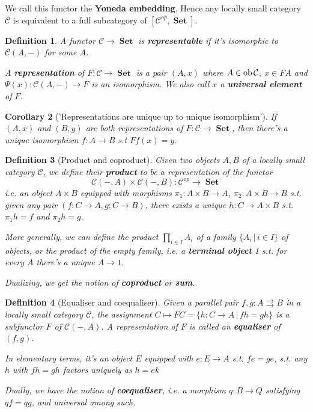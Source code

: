 \documentclass[a4paper]{article}
\newtheorem{definition}{Definition}
\newtheorem{corollary}[definition]{Corollary}
\numberwithin{definition}{section}
\newcommand*\ob[1]{\textnormal{ob}\,#1}
\DeclareMathOperator{\Set}{\textbf{Set}}
\begin{document}
We call this functor the \textbf{Yoneda embedding}. Hence any locally small category $\mathcal{C}$ is equivalent to a full subcategory of $[\mathcal{C}^{op}, \Set]$.

\begin{definition}
	A functor $\mathcal{C} \to \Set$ is \textbf{representable} if it's isomorphic to $\mathcal{C}(A, -)$ for some $A$.
	
	A \textbf{representation} of $F: \mathcal{C} \to \Set$ is a pair $(A, x)$ where $A \in \ob \mathcal{C}$, $x \in FA$ and $\Psi(x): \mathcal{C}(A, -) \to F$ is an isomorphism.
	We also call $x$ a \textbf{universal element} of $F$.
\end{definition}

\begin{corollary}['Representations are unique up to unique isomorphism']
	If $(A, x)$ and $(B, y)$ are both representations of $F: \mathcal{C} \to \Set$, then there's a unique isomorphism $f: A \to B$ s.t $Ff(x)=y$.
\end{corollary}

\begin{definition}[Product and coproduct]
	Given two objects $A, B$ of a locally small category $\mathcal{C}$, we define their \textbf{product} to be a representation of the functor
	$$\mathcal{C}(-,A) \times \mathcal{C}(-, B): \mathcal{C}^{op} \to \Set$$
	i.e. an object $A \times B$ equipped with morphisms $\pi_1 : A \times B \to A$, $\pi_2: A \times B \to B$
	s.t. given any pair $(f:C \to A, g: C \to B)$, there exists a unique $h: C \to A \times B$
	s.t. $\pi_1h=f$ and $\pi_2h=g$.
	
	More generally, we can define the product $\prod_{i \in I} A_i$ of a family $\{A_i \,|\, i \in I\}$ of objects,
	or the product of the empty family, i.e. a \textbf{terminal object} 1 s.t. for every $A$ there's a unique $A \to 1$.
	
	Dualizing, we get the notion of \textbf{coproduct} or \textbf{sum}.
\end{definition}

\begin{definition}[Equaliser and coequaliser]
	Given a parallel pair $f, g: A \rightrightarrows B$ in a locally small category $\mathcal{C}$,
	the assignment $C \mapsto FC = \{h: C \to A \,|\, fh=gh\}$ is a subfunctor $F$ of $\mathcal{C}(-, A)$.
	A representation of $F$ is called an \textbf{equaliser} of $(f, g)$.
	
	In elementary terms, it's an object $E$ equipped with $e: E \to A$ s.t. $fe=ge$,
	s.t. any $h$ with $fh = gh$ factors uniquely as $h=ek$
	
	Dually, we have the notion of \textbf{coequaliser},
	i.e. a morphism $q:B \to Q$ satisfying $qf=qg$, and universal among such.
\end{definition}
\end{document}

